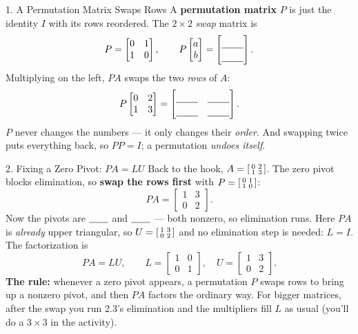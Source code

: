 \documentclass[10pt]{article}
\newcommand{\PP}{P}
\begin{document}
\begin{notesbox}{1. A Permutation Matrix Swaps Rows}
A \textbf{permutation matrix} $\PP$ is just the identity $I$ with its rows reordered. The $2\times2$
\emph{swap} matrix is
\[
  \PP = \begin{bmatrix} 0 & 1 \\ 1 & 0 \end{bmatrix},
  \qquad
  \PP\begin{bmatrix} a \\ b \end{bmatrix} = \begin{bmatrix}\rule{0pt}{1.1em}\blank{0.8cm}\\[2pt]\blank{0.8cm}\end{bmatrix}.
\]
Multiplying on the left, $\PP A$ swaps the two \emph{rows} of $A$:
\[
  \PP\begin{bmatrix} 0 & 2 \\ 1 & 3 \end{bmatrix}
  = \begin{bmatrix}\rule{0pt}{1.1em}\blank{0.8cm} & \blank{0.8cm}\\[2pt]\blank{0.8cm} & \blank{0.8cm}\end{bmatrix}.
\]
$\PP$ never changes the numbers --- it only changes their \emph{order}. And swapping twice puts
everything back, so $\PP\PP=I$; a permutation \emph{undoes itself}.
\end{notesbox}

\begin{notesbox}{2. Fixing a Zero Pivot: $\PP A=LU$}
Back to the hook, $A=\begin{bsmallmatrix} 0&2\\1&3 \end{bsmallmatrix}$. The zero pivot blocks elimination,
so \textbf{swap the rows first} with $\PP=\begin{bsmallmatrix} 0&1\\1&0 \end{bsmallmatrix}$:
\[
  \PP A = \begin{bmatrix} 1 & 3 \\ 0 & 2 \end{bmatrix}.
\]
Now the pivots are $\blank{0.7cm}$ and $\blank{0.7cm}$ --- both nonzero, so elimination runs. Here
$\PP A$ is \emph{already} upper triangular, so $U=\begin{bsmallmatrix} 1&3\\0&2 \end{bsmallmatrix}$ and no
elimination step is needed: $L=I$. The factorization is
\[
  \PP A = LU, \qquad L=\begin{bmatrix} 1 & 0 \\ 0 & 1 \end{bmatrix},\quad U=\begin{bmatrix} 1 & 3 \\ 0 & 2 \end{bmatrix}.
\]
\textbf{The rule:} whenever a zero pivot appears, a permutation $\PP$ swaps rows to bring up a nonzero
pivot, and then $\PP A$ factors the ordinary way. For bigger matrices, after the swap you run 2.3's
elimination and the multipliers fill $L$ as usual (you'll do a $3\times3$ in the activity).
\end{notesbox}
\end{document}
